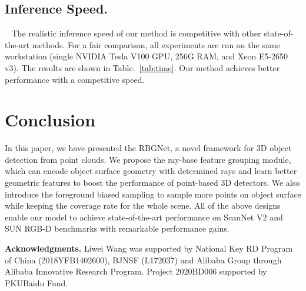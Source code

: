 \documentclass[final]{cvpr}
\begin{document}
\subsection{Inference Speed.}\label{sec:ins}~
The realistic inference speed of our method is competitive with other state-of-the-art methods. For a fair comparison, all experiments are run on the same workstation (single NVIDIA Tesla V100 GPU, 256G RAM, and Xeon E5-2650 v3). The results are shown in Table.~\ref{tab:time}. Our method achieves better performance with a competitive speed.

\vspace{-5pt}
\section{Conclusion}
In this paper, we have presented the RBGNet, a novel framework for 3D object detection from point clouds. We propose the ray-base feature grouping module, which can encode object surface geometry with determined rays and learn better geometric features to boost the performance of point-based 3D detectors. We also introduce the foreground biased sampling to sample more points on object surface while keeping the coverage rate for the whole scene. All of the above designs enable our model to achieve state-of-the-art performance on ScanNet V2 and SUN RGB-D benchmarks with remarkable performance gains. 

\noindent \textbf{Acknowledgments.} Liwei Wang was supported by National Key RD Program of China (2018YFB1402600), BJNSF (L172037) and Alibaba Group through Alibaba Innovative Research Program. Project 2020BD006 supported by PKUBaidu Fund.

\newpage 
\end{document}
